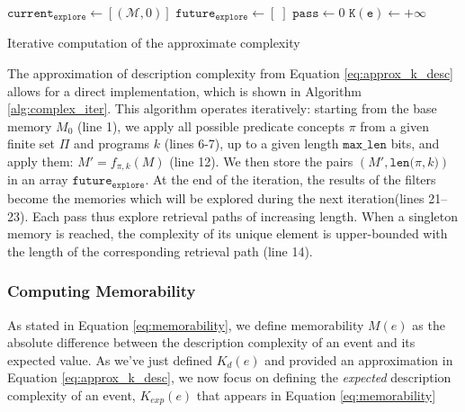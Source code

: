 \documentclass[entropy,article,submit,moreauthors,pdftex]{Definitions/mdpi}
\begin{document}
\begin{algorithm}
    $\mathtt{current_{explore}} \leftarrow [(\mathcal{M}, 0)]$ \;
    $\mathtt{future_{explore} \leftarrow} [\;]$ \;
    $\mathtt{pass} \leftarrow 0$ \;
    $\mathtt{K(e)} \leftarrow +\infty$ \;
    \caption{Iterative computation of the approximate complexity}
    \label{alg:complex_iter}
\end{algorithm}

The approximation of description complexity from Equation \ref{eq:approx_k_desc} allows for
a direct implementation, which is shown in Algorithm \ref{alg:complex_iter}. This
algorithm operates iteratively: starting from the base memory $M_0$
(line 1), we apply all possible predicate concepts $\pi$ from a given finite set
$\Pi$ and programs $k$ (lines 6-7), up to a given length $\mathtt
    {max\_len}$ bits, and apply them: $M' = f_{\pi, k}(M)$ (line 12). We then store
the pairs $(M', \mathtt{len(}\pi, k\mathtt{)})$ in an array $\mathtt{future_
            {explore}}$. At the end of the iteration, the results of the filters become the
memories which will be explored during the next iteration(lines 21--23). Each
pass thus explore retrieval paths of increasing length. When a singleton memory
is reached, the complexity of its unique element is upper-bounded with the
length of the corresponding retrieval path (line 14).

\subsubsection{Computing Memorability}
As stated in Equation \ref{eq:memorability}, we define memorability $M(e)$ as the absolute difference between the description complexity of an event and its expected value. As we've just defined $K_d(e)$ and provided an approximation in Equation \ref{eq:approx_k_desc}, we now focus on defining the \emph{expected} description complexity of an event, $K_{exp}(e)$ that appears in Equation \ref{eq:memorability}
\end{document}
